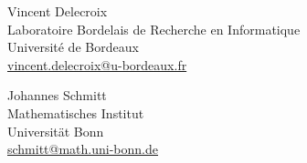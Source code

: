 \documentclass[11pt]{article}
\newcommand{\M}{\ensuremath{\overline{\mathcalorig{M}}}}
\begin{document}






\vspace{+16 pt}
\noindent Vincent Delecroix \\
\noindent Laboratoire Bordelais de Recherche en Informatique \\
\noindent Universit\'e de Bordeaux \\
\noindent \href{mailto:vincent.delecroix@u-bordeaux.fr}{vincent.delecroix@u-bordeaux.fr}

\vspace{+16 pt}
\noindent Johannes Schmitt \\
\noindent Mathematisches Institut \\
\noindent Universit\"at Bonn \\
\noindent \href{mailto:schmitt@math.uni-bonn.de}{schmitt@math.uni-bonn.de}
\end{document}
